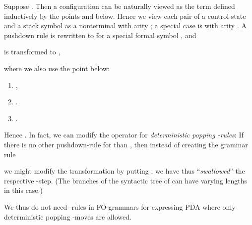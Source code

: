 \documentclass{llncs}
\begin{document}
Suppose . Then 
a configuration  
can be naturally viewed as the term  defined
inductively by the points  and  below. 
Hence we view each pair  of a control state and a stack symbol as 
a nonterminal  with arity ; a special case is  with arity .
A pushdown rule  is rewritten to 
  for a special formal symbol , and
\begin{center}
  
 is transformed to  , 
\end{center}
where we also use the point  below:
\begin{enumerate}
	\item
		,
	\item
		.
	\item
		.
\end{enumerate}
Hence
.
In fact, we can modify the operator  
for \emph{deterministic popping -rules}: 
If there is no other pushdown-rule for  than 
, then instead of creating 
the grammar rule
 
we might modify the transformation  by putting
; we have thus
``\emph{swallowed}'' the respective -step.
(The branches of the syntactic tree of 
  can have varying lengths in this case.)

We thus do not need -rules in FO-grammars for expressing
PDA where only deterministic popping -moves are allowed.
\end{document}
